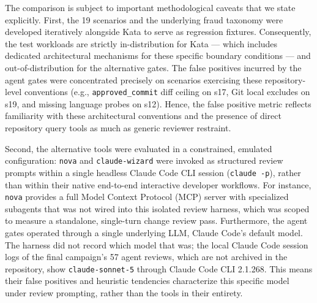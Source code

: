 \documentclass[11pt]{article}
\begin{document}
The comparison is subject to important methodological caveats that we state explicitly.
First, the 19 scenarios and the underlying fraud taxonomy were developed iteratively alongside Kata to serve as regression fixtures. Consequently, the test workloads are strictly in-distribution for Kata --- which includes dedicated architectural mechanisms for these specific boundary conditions --- and out-of-distribution for the alternative gates. The false positives incurred by the agent gates were concentrated precisely on scenarios exercising these repository-level conventions (e.g., \texttt{approved\_commit} diff ceiling on s17, Git local excludes on s19, and missing language probes on s12). Hence, the false positive metric reflects familiarity with these architectural conventions and the presence of direct repository query tools as much as generic reviewer restraint.

Second, the alternative tools were evaluated in a constrained, emulated configuration: \texttt{nova} and \texttt{claude-wizard} were invoked as structured review prompts within a single headless Claude Code CLI session (\texttt{claude -p}), rather than within their native end-to-end interactive developer workflows. For instance, \texttt{nova} provides a full Model Context Protocol (MCP) server with specialized subagents that was not wired into this isolated review harness, which was scoped to measure a standalone, single-turn change review pass. Furthermore, the agent gates operated through a single underlying LLM, Claude Code's default model. The harness did not record which model that was; the local Claude Code session logs of the final campaign's 57 agent reviews, which are not archived in the repository, show \texttt{claude-sonnet-5} through Claude Code CLI 2.1.268. This means their false positives and heuristic tendencies characterize this specific model under review prompting, rather than the tools in their entirety.
\end{document}

